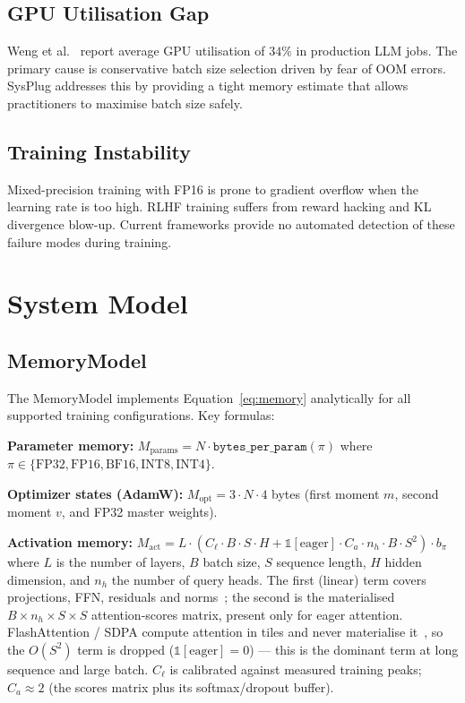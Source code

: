 \documentclass[10pt,twocolumn]{article}
\begin{document}
\subsection{GPU Utilisation Gap}

Weng et al.~\cite{weng2022low} report average GPU utilisation of $34\%$ in
production LLM jobs.  The primary cause is conservative batch size selection
driven by fear of OOM errors.  SysPlug addresses this by providing a tight
memory estimate that allows practitioners to maximise batch size safely.

\subsection{Training Instability}

Mixed-precision training with FP16 is prone to gradient overflow when the
learning rate is too high.  RLHF training suffers from reward hacking and KL
divergence blow-up.  Current frameworks provide no automated detection of
these failure modes during training.

\section{System Model}

\subsection{MemoryModel}

The MemoryModel implements Equation~\ref{eq:memory} analytically for all
supported training configurations.  Key formulas:

\textbf{Parameter memory:}
$M_\text{params} = N \cdot \texttt{bytes\_per\_param}(\pi)$
where $\pi \in \{\text{FP32}, \text{FP16}, \text{BF16}, \text{INT8}, \text{INT4}\}$.

\textbf{Optimizer states (AdamW):}
$M_\text{opt} = 3 \cdot N \cdot 4$ bytes (first moment $m$, second moment $v$,
and FP32 master weights).

\textbf{Activation memory:}
$M_\text{act} = L \cdot \left( C_\ell \cdot B \cdot S \cdot H
+ \mathbb{1}[\text{eager}] \cdot C_a \cdot n_h \cdot B \cdot S^2 \right) \cdot b_\pi$
where $L$ is the number of layers, $B$ batch size, $S$ sequence length, $H$
hidden dimension, and $n_h$ the number of query heads. The first (linear) term
covers projections, FFN, residuals and norms~\cite{korthikanti2022reducing};
the second is the materialised $B{\times}n_h{\times}S{\times}S$ attention-scores
matrix, present only for eager attention. FlashAttention / SDPA compute
attention in tiles and never materialise it~\cite{dao2022flashattention}, so the
$O(S^2)$ term is dropped ($\mathbb{1}[\text{eager}]=0$) --- this is the dominant
term at long sequence and large batch. $C_\ell$ is calibrated against measured
training peaks; $C_a \approx 2$ (the scores matrix plus its softmax/dropout
buffer).
\end{document}
